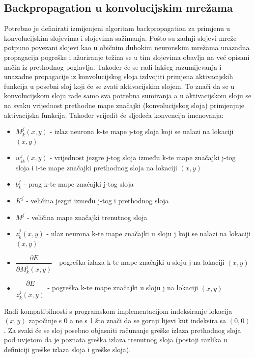 \documentclass[times, utf8, zavrsni, numeric]{fer}
\begin{document}
\subsection{Backpropagation u konvolucijskim mrežama}
Potrebno je definirati izmijenjeni algoritam backpropagation za primjenu u konvolucijskim slojevima i slojevima sažimanja. Pošto su zadnji slojevi mreže potpuno povezani slojevi kao u običnim dubokim neuronskim mrežama unazadna propagacija pogreške i ažuriranje težina se u tim slojevima obavlja na već opisani način iz prethodnog poglavlja. Također će se radi lakšeg razumijevanja i unazadne propagacije iz konvolucijskog sloja izdvojiti primjena aktivacijskih funkcija u posebni sloj koji će se zvati aktivacijskim slojem. To znači da se u konvolucijskom sloju rade samo sva potrebna sumiranja a u aktivacijskom sloju se na svaku vrijednost prethodne mape značajki (konvolucijskog sloja) primjenjuje aktivacijska funkcija. Također vrijedit će sljedeća konvencija imenovanja:
\begin{itemize}
  \item $M_k^j (x, y)$ - izlaz neurona k-te mape j-tog sloja koji se nalazi na lokaciji $(x, y)$
  \item $w^j_{ik} (x, y)$ - vrijednost jezgre j-tog sloja između k-te mape značajki j-tog sloja i i-te mape značajki prethodnog sloja na lokaciji $(x, y)$
  \item $b^j_k$ - prag k-te mape značajki j-tog sloja
  \item $K^j$ - veličina jezgri između j-tog i prethodnog sloja
  \item $M^j$ - veličina mape značajki trenutnog sloja
  \item $z^j_k (x, y)$ - ulaz neurona k-te mape značajki u sloju j koji se nalazi na lokaciji $(x, y)$
  \item $\dfrac{\partial E}{\partial M^j_k (x, y)}$ - pogreška izlaza k-te mape značajki u sloju j na lokaciji $(x, y)$
  \item $\dfrac{\partial E}{z^j_k (x, y)}$ - pogreška k-te mape značajki u sloju j na lokaciji $(x, y)$
\end{itemize}

Radi kompatibilnosti s programskom implementacijom indeksiranje lokacija $(x, y)$ započinje s 0 a ne s 1 što znači da se gornji lijevi kut indeksira sa $(0, 0)$.
Za svaki će se sloj posebno objasniti računanje greške izlaza prethodnog sloja pod uvjetom da je poznata greška izlaza trenutnog sloja (postoji razlika u definiciji greške izlaza sloja i greške sloja).
\end{document}
